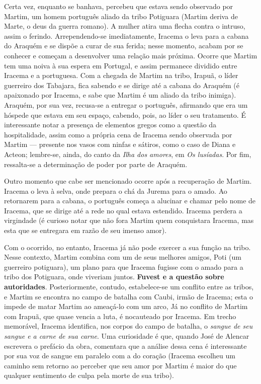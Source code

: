 Certa vez, enquanto se banhava, percebeu que estava sendo observado por Martim, um homem português aliado da tribo Potiguara (Martim deriva de Marte, o deus da guerra romano). A mulher atira uma flecha contra o intruso, assim o ferindo. Arrependendo-se imediatamente, Iracema o leva para a cabana do Araquém e se dispõe a curar de sua ferida; nesse momento, acabam por se conhecer e começam a desenvolver uma relação mais próxima. Ocorre que Martim tem uma noiva à sua espera em Portugal, e assim permanece dividido entre Iracema e a portuguesa. Com a chegada de Martim na tribo, Irapuã, o líder guerreiro dos Tabajara, fica sabendo e se dirige até a cabana do Araquém (é apaixonado por Iracema, e sabe que Martim é um aliado da tribo inimiga). Araquém, por sua vez, recusa-se a entregar o português, afirmando que era um hóspede que estava em seu espaço, cabendo, pois, ao líder o seu tratamento. É interessante notar a presença de elementos gregos como a questão da hospitalidade, assim como a própria cena de Iracema sendo observada por Martim — presente nos vasos com ninfas e sátiros, como o caso de Diana e Acteon; lembre-se, ainda, do canto da \textit{Ilha dos amores}, em \textit{Os lusíadas}. Por fim, ressalta-se a determinação de poder por parte de Araquém.

Outro momento que cabe ser mencionado ocorre após a recuperação de Martim. Iracema o leva à selva, onde prepara o chá da Jurema para o amado. Ao retornarem para a cabana, o português começa a alucinar e chamar pelo nome de Iracema, que se dirige até a rede no qual estava estendido. Iracema perdera a virgindade (é curioso notar que não fora Martim quem conquistara Iracema, mas esta que se entregara em razão de seu imenso amor).

Com o ocorrido, no entanto, Iracema já não pode exercer a sua função na tribo. Nesse contexto, Martim combina com um de seus melhores amigos, Poti (um guerreiro potiguara), um plano para que Iracema fugisse com o amado para a tribo dos Potiguara, onde viveriam juntos. \textbf{Fuvest e a questão sobre autoridades}. Posteriormente, contudo, estabelece-se um conflito entre as tribos, e Martim se encontra no campo de batalha com Caubi, irmão de Iracema; esta o impede de matar Martim ao ameaçá-lo com um arco, Já no conflito de Martim com Irapuã, que quase vencia a luta, é nocauteado por Iracema. Em trecho memorável, Iracema identifica, nos corpos do campo de batalha, o \textit{sangue de seu sangue e a carne de sua carne}. Uma curiosidade é que, quando José de Alencar escrevera o prefácio da obra, comentara que a análise dessa cena é interessante por sua voz de sangue em paralelo com a do coração (Iracema escolheu um caminho sem retorno ao perceber que seu amor por Martim é maior do que qualquer sentimento de culpa pela morte de sua tribo).

